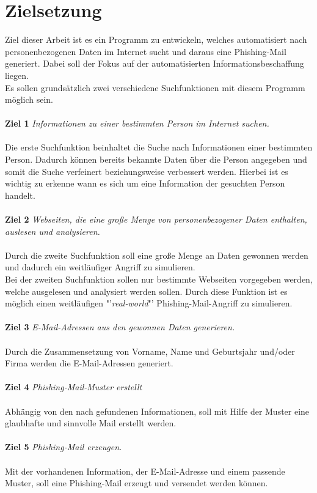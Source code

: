 \section{Zielsetzung}
\label {sec:Zielsetzung}
 Ziel dieser Arbeit ist es ein Programm zu entwickeln, welches automatisiert nach personenbezogenen Daten im Internet sucht und daraus eine Phishing-Mail generiert. Dabei soll der Fokus auf der automatisierten Informationsbeschaffung liegen.\\ 
 Es sollen grundsätzlich zwei verschiedene Suchfunktionen mit diesem Programm möglich sein. \\\\
 {\bf Ziel 1} \textit{Informationen zu einer bestimmten Person im Internet suchen.}\\\\
 Die erste Suchfunktion beinhaltet die Suche nach Informationen einer bestimmten Person. Dadurch können bereits bekannte Daten über die Person angegeben und somit die Suche verfeinert beziehungsweise verbessert werden. Hierbei ist es wichtig zu erkenne wann es sich um eine Information der gesuchten Person handelt.\\\\
 {\bf Ziel 2} \textit{Webseiten, die eine große Menge von personenbezogener Daten enthalten, auslesen und analysieren.}\\\\
 Durch die zweite Suchfunktion soll eine große Menge an Daten gewonnen werden und dadurch ein weitläufiger Angriff zu simulieren.\\
 Bei der zweiten Suchfunktion sollen nur bestimmte Webseiten vorgegeben werden, welche ausgelesen und analysiert werden sollen. Durch diese Funktion ist es möglich einen weitläufigen "'\textit{real-world}"' Phishing-Mail-Angriff zu simulieren.\\\\
 {\bf Ziel 3} \textit{E-Mail-Adressen aus den gewonnen Daten generieren.}\\\\
 Durch die Zusammensetzung von Vorname, Name und Geburtsjahr und/oder Firma werden die E-Mail-Adressen generiert.\\\\
 {\bf Ziel 4} \textit{Phishing-Mail-Muster erstellt}\\\\
 Abhängig von den nach gefundenen Informationen, soll mit Hilfe der Muster eine glaubhafte und sinnvolle Mail erstellt werden.\\\\
 {\bf Ziel 5} \textit{Phishing-Mail erzeugen.}\\\\
 Mit der vorhandenen Information, der E-Mail-Adresse und einem passende Muster, soll eine Phishing-Mail erzeugt und versendet werden können.
 
